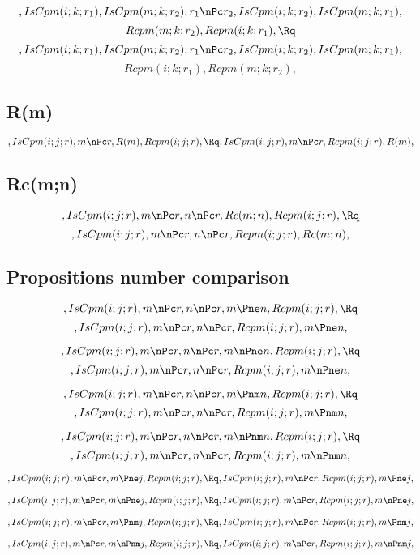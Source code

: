 \[, IsCpm(i;k;r_1), IsCpm(m;k;r_2), r_1 \nPc r_2, IsCpm(i;k;r_2), IsCpm(m;k;r_1),\]
\[Rcpm(m;k;r_2), Rcpm(i;k;r_1), \Rq \]
\[, IsCpm(i;k;r_1), IsCpm(m;k;r_2), r_1 \nPc r_2, IsCpm(i;k;r_2), IsCpm(m;k;r_1), \]
\[Rcpm(i;k;r_1), Rcpm(m;k;r_2),\]





\bigskip
\bigskip
\subsection{R(m)}
\[, IsCpm(i;j;r), m \nPc r, R(m), Rcpm(i;j;r), \Rq , IsCpm(i;j;r), m \nPc r, Rcpm(i;j;r), R(m), \]


\bigskip
\bigskip
\subsection{Rc(m;n)}
\[, IsCpm(i;j;r), m \nPc r, n \nPc r, Rc(m;n), Rcpm(i;j;r), \Rq \]
\[, IsCpm(i;j;r), m \nPc r, n \nPc r, Rcpm(i;j;r),  Rc(m;n),\]




\bigskip
\bigskip
\subsection{Propositions number comparison}
\[, IsCpm(i;j;r), m \nPc r, n \nPc r, m \Pne n, Rcpm(i;j;r), \Rq \]
\[, IsCpm(i;j;r), m \nPc r, n \nPc r, Rcpm(i;j;r), m \Pne n,\]

\[, IsCpm(i;j;r), m \nPc r, n \nPc r, m \nPne n, Rcpm(i;j;r), \Rq \]
\[, IsCpm(i;j;r), m \nPc r, n \nPc r, Rcpm(i;j;r), m \nPne n,\]

\[, IsCpm(i;j;r), m \nPc r, n \nPc r, m \Pnm n, Rcpm(i;j;r), \Rq \]
\[, IsCpm(i;j;r), m \nPc r, n \nPc r, Rcpm(i;j;r), m \Pnm n,\]

\[, IsCpm(i;j;r), m \nPc r, n \nPc r, m \nPnm n, Rcpm(i;j;r), \Rq \]
\[, IsCpm(i;j;r), m \nPc r, n \nPc r, Rcpm(i;j;r), m \nPnm n,\]

\[, IsCpm(i;j;r), m \nPc r, m \Pne j, Rcpm(i;j;r), \Rq , IsCpm(i;j;r), m \nPc r, Rcpm(i;j;r), m \Pne j,\]

\[, IsCpm(i;j;r), m \nPc r, m \nPne j, Rcpm(i;j;r), \Rq, IsCpm(i;j;r), m \nPc r, Rcpm(i;j;r), m \nPne j,\]

\[, IsCpm(i;j;r), m \nPc r, m \Pnm j, Rcpm(i;j;r), \Rq, IsCpm(i;j;r), m \nPc r, Rcpm(i;j;r), m \Pnm j,\]

\[, IsCpm(i;j;r), m \nPc r, m \nPnm j, Rcpm(i;j;r), \Rq , IsCpm(i;j;r), m \nPc r, Rcpm(i;j;r), m \nPnm j,\]


